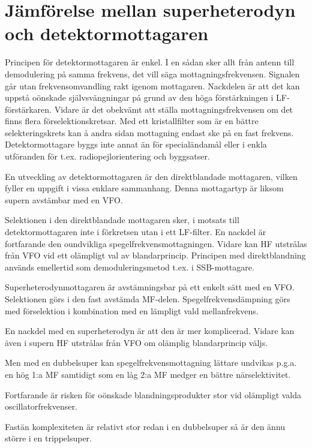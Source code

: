 \section[Jämförelse superheterodyn]{Jämförelse mellan superheterodyn och detektormottagaren}
\label{superheterojämförelse}

Principen för detektormottagaren är enkel.
I en sådan sker allt från antenn till demodulering på samma frekvens,
det vill säga mottagningsfrekvensen.
Signalen går utan frekvensomvandling rakt igenom mottagaren.
Nackdelen är att det kan uppstå oönskade självsvängningar på grund av den
höga förstärkningen i LF-förstärkaren.
Vidare är det obekvämt att ställa mottagningsfrekvensen om det finns flera
förselektionskretsar.
Med ett kristallfilter som är en bättre selekteringskrets kan å andra sidan
mottagning endast ske på en fast frekvens.
Detektormottagare byggs inte annat än för specialändamål eller i enkla
utföranden för t.ex. radiopejlorientering och byggsatser.

En utveckling av detektormottagaren är den direktblandade mottagaren,
vilken fyller en uppgift i vissa enklare sammanhang.
Denna mottagartyp är liksom supern avstämbar med en VFO.

Selektionen i den direktblandade mottagaren sker, i motsats till
detektormottagaren inte i förkretsen utan i ett LF-filter.
En nackdel är fortfarande den oundvikliga spegelfrekvensmottagningen.
Vidare kan HF utstrålas från VFO vid ett olämpligt val av blandarprincip.
Principen med direktblandning används emellertid som demoduleringsmetod t.ex.
i SSB-mottagare.

Superheterodynmottagaren är avstämningsbar på ett enkelt sätt med en VFO.
Selektionen görs i den fast avstämda MF-delen.
Spegelfrekvensdämpning görs med förselektion i kombination med en lämpligt
vald mellanfrekvens.

En nackdel med en superheterodyn är att den är mer komplicerad.
Vidare kan även i supern HF utstrålas från VFO om olämplig blandarprincip väljs.

Men med en dubbelsuper kan spegelfrekvensmottagning lättare undvikas
p.g.a. en hög 1:a MF samtidigt som en låg 2:a MF medger en bättre
närselektivitet.

Fortfarande är risken för oönskade blandningsprodukter stor vid
olämpligt valda oscillatorfrekvenser.

Fastän komplexiteten är relativt stor redan i en dubbelsuper så är den
ännu större i en trippelsuper.
